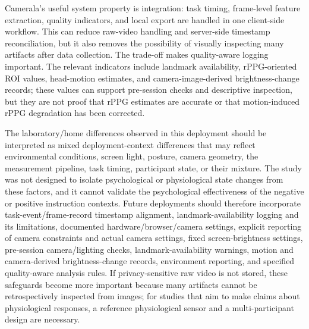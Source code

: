 \documentclass[dvipdfmx]{ehis}
\begin{document}
Camerala's useful system property is integration: task timing, frame-level feature extraction, quality indicators, and local export are handled in one client-side workflow.
This can reduce raw-video handling and server-side timestamp reconciliation, but it also removes the possibility of visually inspecting many artifacts after data collection.
The trade-off makes quality-aware logging important.
The relevant indicators include landmark availability, rPPG-oriented ROI values, head-motion estimates, and camera-image-derived brightness-change records; these values can support pre-session checks and descriptive inspection, but they are not proof that rPPG estimates are accurate or that motion-induced rPPG degradation has been corrected.

The laboratory/home differences observed in this deployment should be interpreted as mixed deployment-context differences that may reflect environmental conditions, screen light, posture, camera geometry, the measurement pipeline, task timing, participant state, or their mixture.
The study was not designed to isolate psychological or physiological state changes from these factors, and it cannot validate the psychological effectiveness of the negative or positive instruction contexts.
Future deployments should therefore incorporate task-event/frame-record timestamp alignment, landmark-availability logging and its limitations, documented hardware/browser/camera settings, explicit reporting of camera constraints and actual camera settings, fixed screen-brightness settings, pre-session camera/lighting checks, landmark-availability warnings, motion and camera-derived brightness-change records, environment reporting, and specified quality-aware analysis rules.
If privacy-sensitive raw video is not stored, these safeguards become more important because many artifacts cannot be retrospectively inspected from images; for studies that aim to make claims about physiological responses, a reference physiological sensor and a multi-participant design are necessary.
\end{document}
